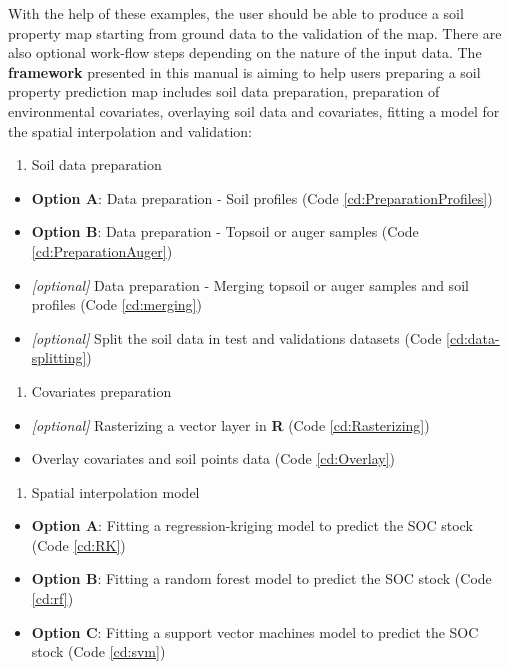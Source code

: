 \documentclass[10pt,b5paper,]{book}
\providecommand{\tightlist}{%
  \setlength{\itemsep}{0pt}\setlength{\parskip}{0pt}}
\theoremstyle{definition}
\theoremstyle{definition}
\theoremstyle{definition}
\theoremstyle{remark}
\begin{document}
With the help of these examples, the user should be able to produce a
soil property map starting from ground data to the validation of the
map. There are also optional work-flow steps depending on the nature of
the input data. The \textbf{framework} presented in this manual is
aiming to help users preparing a soil property prediction map includes
soil data preparation, preparation of environmental covariates,
overlaying soil data and covariates, fitting a model for the spatial
interpolation and validation:

\begin{enumerate}
\def\labelenumi{\arabic{enumi}.}
\tightlist
\item
  Soil data preparation
\end{enumerate}

\begin{itemize}
\tightlist
\item
  \textbf{Option A}: Data preparation - Soil profiles (Code
  \ref{cd:PreparationProfiles})
\item
  \textbf{Option B}: Data preparation - Topsoil or auger samples (Code
  \ref{cd:PreparationAuger})
\item
  \emph{{[}optional{]}} Data preparation - Merging topsoil or auger
  samples and soil profiles (Code \ref{cd:merging})
\item
  \emph{{[}optional{]}} Split the soil data in test and validations
  datasets (Code \ref{cd:data-splitting})
\end{itemize}

\begin{enumerate}
\def\labelenumi{\arabic{enumi}.}
\setcounter{enumi}{1}
\tightlist
\item
  Covariates preparation
\end{enumerate}

\begin{itemize}
\tightlist
\item
  \emph{{[}optional{]}} Rasterizing a vector layer in \textbf{R} (Code
  \ref{cd:Rasterizing})
\item
  Overlay covariates and soil points data (Code \ref{cd:Overlay})
\end{itemize}

\begin{enumerate}
\def\labelenumi{\arabic{enumi}.}
\setcounter{enumi}{2}
\tightlist
\item
  Spatial interpolation model
\end{enumerate}

\begin{itemize}
\tightlist
\item
  \textbf{Option A}: Fitting a regression-kriging model to predict the
  SOC stock (Code \ref{cd:RK})
\item
  \textbf{Option B}: Fitting a random forest model to predict the SOC
  stock (Code \ref{cd:rf})
\item
  \textbf{Option C}: Fitting a support vector machines model to predict
  the SOC stock (Code \ref{cd:svm})
\end{itemize}
\end{document}

